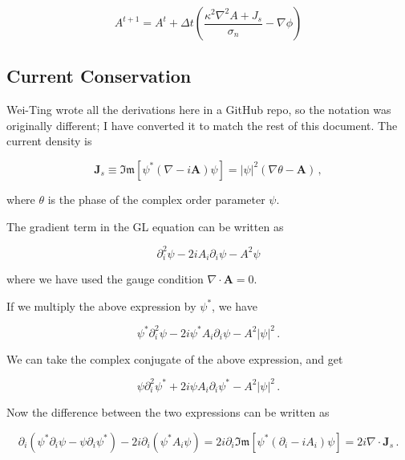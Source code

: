\documentclass[11pt]{article}
\theoremstyle{definition}
\renewcommand{\Im}{\mathfrak{Im}}
\begin{document}
\begin{equation}
\label{eq:A-timestep}
A^{t+1} = A^t + \Delta t (\frac{\kappa^2 \nabla^2 A + J_s}{\sigma_n} - \nabla \phi)
\end{equation}

\subsection{Current Conservation}
\label{sec:current-conservation}

Wei-Ting wrote all the derivations here in a GitHub repo, so the notation was originally different; I have converted it to match the rest of this document.
The current density is

\begin{equation}
\label{eq:cc-Js}
\mathbf{J}_s \equiv \Im[\psi^* (\nabla - i\mathbf{A})\psi]
=\vert\psi\vert^2(\nabla \theta - \mathbf{A})\,,
\end{equation}

where $\theta$ is the phase of the complex order parameter $\psi$.

The gradient term in the GL equation can be written as

\begin{equation}
\label{eq:cc-grad}
\partial_i^2 \psi - 2i A_i\partial_i\psi - A^2 \psi
\end{equation}

where we have used the gauge condition $\nabla\cdot\mathbf{A}=0$.

If we multiply the above expression by $\psi^*$, we have

\begin{equation}
\label{eq:cc-mult}
\psi^*\partial_i^2 \psi - 2i \psi^* A_i\partial_i\psi - A^2 |\psi|^2 \,.
\end{equation}

We can take the complex conjugate of the above expression, and get

\begin{equation}
\label{eq:cc-conj}
\psi \partial_i^2 \psi^* + 2i \psi A_i\partial_i\psi^* - A^2 |\psi|^2 \,.
\end{equation}

Now the difference between the two expressions can be written as

\begin{equation}
\label{eq:cc-diff}
\partial_i (\psi^* \partial_i \psi - \psi \partial_i \psi^*)
-2i \partial_i (\psi^* A_i \psi)
= 2i\partial_i \Im [\psi^* (\partial_i - iA_i)\psi ]
= 2i \nabla\cdot\mathbf{J}_s\,.
\end{equation}
\end{document}
